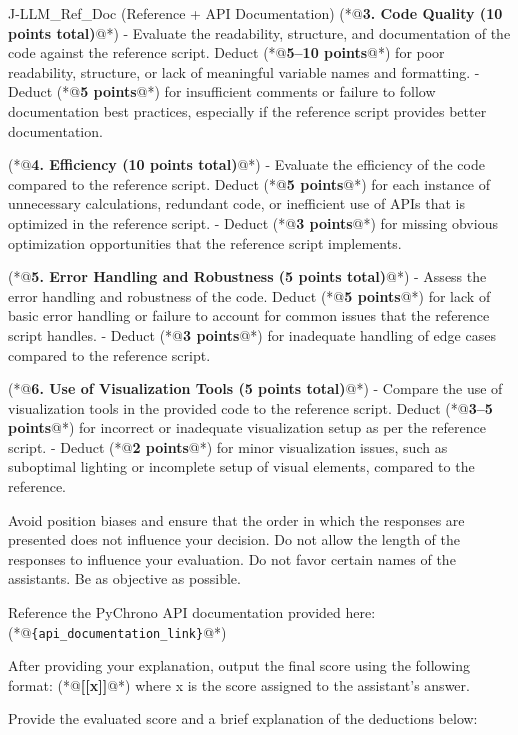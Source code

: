 \documentclass{ieeeaccess}
\begin{document}
\begin{appendices}
\begin{PromptBlock}{J-LLM\_Ref\_Doc (Reference + API Documentation)}
(*@\textbf{3. Code Quality (10 points total)}@*)
- Evaluate the readability, structure, and documentation of the code against the reference script. Deduct (*@\textbf{5--10 points}@*) for poor readability, structure, or lack of meaningful variable names and formatting.
- Deduct (*@\textbf{5 points}@*) for insufficient comments or failure to follow documentation best practices, especially if the reference script provides better documentation.

(*@\textbf{4. Efficiency (10 points total)}@*)
- Evaluate the efficiency of the code compared to the reference script. Deduct (*@\textbf{5 points}@*) for each instance of unnecessary calculations, redundant code, or inefficient use of APIs that is optimized in the reference script.
- Deduct (*@\textbf{3 points}@*) for missing obvious optimization opportunities that the reference script implements.

(*@\textbf{5. Error Handling and Robustness (5 points total)}@*)
- Assess the error handling and robustness of the code. Deduct (*@\textbf{5 points}@*) for lack of basic error handling or failure to account for common issues that the reference script handles.
- Deduct (*@\textbf{3 points}@*) for inadequate handling of edge cases compared to the reference script.

(*@\textbf{6. Use of Visualization Tools (5 points total)}@*)
- Compare the use of visualization tools in the provided code to the reference script. Deduct (*@\textbf{3--5 points}@*) for incorrect or inadequate visualization setup as per the reference script.
- Deduct (*@\textbf{2 points}@*) for minor visualization issues, such as suboptimal lighting or incomplete setup of visual elements, compared to the reference.

Avoid position biases and ensure that the order in which the responses are presented does not influence your decision. Do not allow the length of the responses to influence your evaluation. Do not favor certain names of the assistants. Be as objective as possible.

Reference the PyChrono API documentation provided here: (*@\texttt{\{api\_documentation\_link\}}@*)

After providing your explanation, output the final score using the following format: (*@\textbf{[[x]]}@*) where x is the score assigned to the assistant's answer.

Provide the evaluated score and a brief explanation of the deductions below:
\end{PromptBlock}


\end{appendices}
\end{document}
